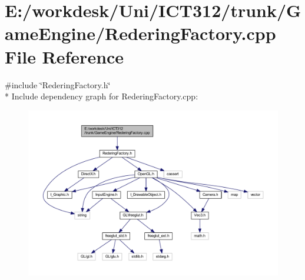 \section{E\+:/workdesk/\+Uni/\+I\+C\+T312/trunk/\+Game\+Engine/\+Redering\+Factory.cpp File Reference}
\label{_redering_factory_8cpp}
{\ttfamily \#include \char`\"{}Redering\+Factory.\+h\char`\"{}}\\*
Include dependency graph for Redering\+Factory.\+cpp\+:\nopagebreak
\begin{figure}[H]
\begin{center}
\leavevmode
\includegraphics[width=350pt]{d7/d0c/_redering_factory_8cpp__incl}
\end{center}
\end{figure}
